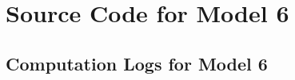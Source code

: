 \section{Source Code for Model 6}


\newpage
\begin{landscape}
    \section{Computation Logs for Model 6}
    
\end{landscape}

% 

%     

% 

%     

